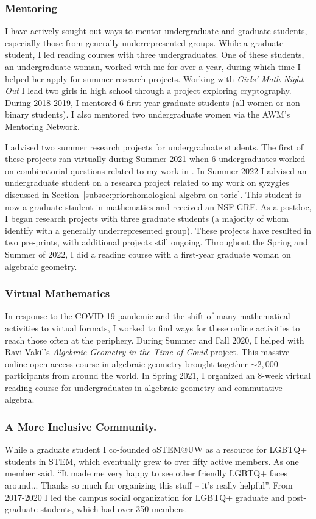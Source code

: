\documentclass[11pt,reqno]{amsart}
\theoremstyle{remark}
\begin{document}
\subsubsection{Mentoring}
I have actively sought out ways to mentor undergraduate and graduate students, especially those from generally underrepresented groups. While a graduate student, I led reading courses with three undergraduates. One of these students, an undergraduate woman, worked with me for over a year, during which time I helped her apply for summer research projects. Working with \textit{Girls' Math Night Out} I lead two girls in high school through a project exploring cryptography. During 2018-2019, I mentored 6 first-year graduate students (all women or non-binary students). I also mentored two undergraduate women via the AWM's Mentoring Network. 

I advised two summer research projects for undergraduate students. The first of these projects ran virtually during Summer 2021 when 6 undergraduates worked on combinatorial questions related to my work in \cite{BBCMMW24}. In Summer 2022 I advised an undergraduate student on a research project related to my work on syzygies discussed in Section~\ref{subsec:prior:homological-algebra-on-toric}. This student is now a graduate student in mathematics and received an NSF GRF. As a postdoc, I began research projects with three graduate students (a majority of whom identify with a generally underrepresented group). These projects have resulted in two pre-prints, with additional projects still ongoing. Throughout the Spring and Summer of 2022, I did a reading course with a first-year graduate woman on algebraic geometry.

\subsubsection{Virtual Mathematics}
In response to the COVID-19 pandemic and the shift of many mathematical activities to virtual formats, I worked to find ways for these online activities to reach those often at the periphery. During Summer and Fall 2020, I helped with Ravi Vakil's \textit{Algebraic Geometry in the Time of Covid} project. This massive online open-access course in algebraic geometry brought together $\sim2,000$ participants from around the world. In Spring 2021, I organized an 8-week virtual reading course for undergraduates in algebraic geometry and commutative algebra. 

\subsubsection{A More Inclusive Community.} 
While a graduate student I co-founded oSTEM@UW as a resource for LGBTQ+ students in STEM, which eventually grew to over fifty active members. As one member said, ``It made me very happy to see other friendly LGBTQ+ faces around... Thanks so much for organizing this stuff -- it's really helpful''. From 2017-2020 I led the campus social organization for LGBTQ+ graduate and post-graduate students, which had over 350 members. 
\end{document}
